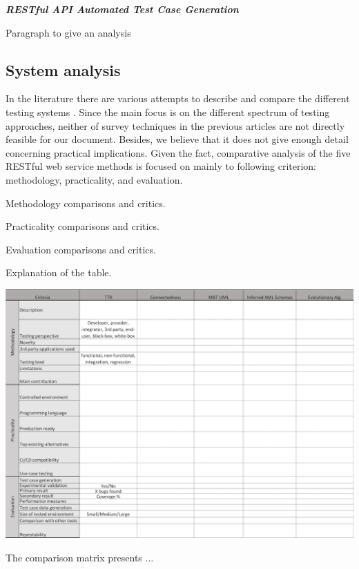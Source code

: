 \documentclass[english]{tktltiki}
\begin{document}
\textit{\textbf{RESTful API Automated Test Case Generation \cite{arcuri2017restful}}}

Paragraph to give an analysis

\subsection{System analysis}
In the literature there are various attempts to describe and compare the different testing systems \cite{canfora2006testing, canfora2009service, bozkurt2013testing}. Since the main focus is on the different spectrum of testing approaches, neither of survey techniques in the previous articles are not directly feasible for our document. Besides, we believe that it does not give enough detail concerning practical implications. Given the fact, comparative analysis of the five RESTful web service methods is focused on mainly to following criterion: methodology, practicality, and evaluation.

Methodology comparisons and critics.

Practicality comparisons and critics.

Evaluation comparisons and critics.

Explanation of the table.

\begin{table}[h]
	\begin{center}
		\hspace*{-1.25cm}
		\includegraphics[width=1.1\textwidth]{images/comparison.png}
		\caption{The comparison matrix presents ...}
		\label{table:comparison}
	\end{center}
\end{table}
\end{document}

